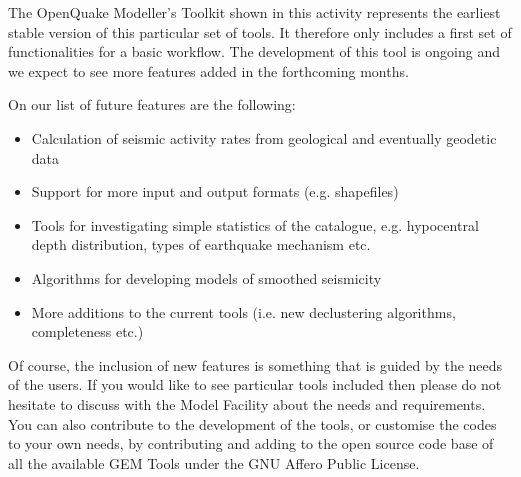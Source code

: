 The OpenQuake Modeller's Toolkit shown in this activity represents the earliest stable version of this particular set of tools. It therefore only includes a first set of functionalities for a basic workflow. The development of this tool is ongoing and we expect to see more features added in the forthcoming months.

On our list of future features are the following:

\begin{itemize}

\item Calculation of seismic activity rates from geological and eventually geodetic data

\item Support for more input and output formats (e.g. shapefiles)

\item Tools for investigating simple statistics of the catalogue, e.g. hypocentral depth distribution, types of earthquake mechanism etc.

\item Algorithms for developing models of smoothed seismicity

\item More additions to the current tools (i.e. new declustering algorithms, completeness etc.)
\end{itemize}
 
Of course, the inclusion of new features is something that is guided by the needs of the users. If you would like to see particular tools included then please do not hesitate to discuss with the Model Facility about the needs and requirements. You can also contribute to the development of the tools, or customise the codes to your own needs, by contributing and adding to the open source code base of all the available GEM Tools under the GNU Affero Public License.

